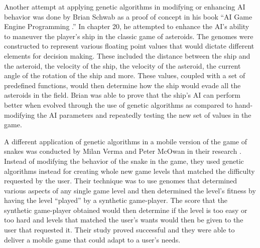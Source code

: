 Another attempt at applying genetic algorithms in modifying or enhancing AI behavior was
done by Brian Schwab as a proof of concept in his book ``AI Game Engine Programming
\cite{Schwab04}.'' In chapter 20, he attempted to enhance the AI's ability to maneuver
the player's ship in the classic game of asteroids. The genomes were constructed to represent
various floating point values that would dictate different elements for decision making.
These included the distance between the ship and the asteroid, the velocity of the ship, the
velocity of the asteroid, the current angle of the rotation of the ship and more. These
values, coupled with a set of predefined functions, would then determine how the ship would
evade all the asteroids in the field. Brian was able to prove that the ship's AI can perform
better when evolved through the use of genetic algorithms as compared to hand-modifying the
AI parameters and repeatedly testing the new set of values in the game.

A different application of genetic algorithms in a mobile version of the game of snakes
was conducted by Milan Verma and Peter McOwan in their research \cite{Verma05}. Instead
of modifying the behavior of the snake in the game, they used genetic algorithms instead
for creating whole new game levels that matched the difficulty requested by the user.
Their technique was to use genomes that determined various aspects of any single game
level and then determined the level's fitness by having the level “played” by a synthetic
game-player. The score that the synthetic game-player obtained would then determine if
the level is too easy or too hard and levels that matched the user's wants would then be
given to the user that requested it. Their study proved successful and they were able to
deliver a mobile game that could adapt to a user's needs.